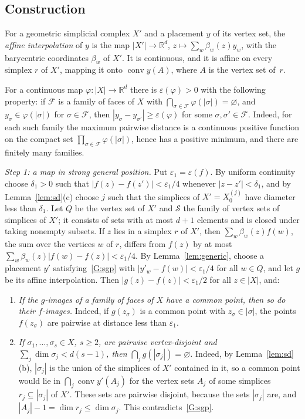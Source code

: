 \documentclass[11pt]{article}
\theoremstyle{definition}
\numberwithin{equation}{section}
\newcommand{\R}{\mathbb R}
\DeclareMathOperator{\conv}{conv}
\begin{document}
\subsection{Construction}

For a geometric simplicial complex $X'$ and a placement $y$ of its vertex set, the \emph{affine interpolation} of $y$ is the map $|X'|\to\R^d$, $z\mapsto\sum_w\beta_w(z)y_w$, with the barycentric coordinates $\beta_w$ of $X'$. It is continuous, and it is affine on every simplex $r$ of $X'$, mapping it onto $\conv y(A)$, where $A$ is the vertex set of~$r$.

For a continuous map $\varphi:|X|\to\R^d$ there is $\varepsilon(\varphi)>0$ with the following property: if $\mathcal F$ is a family of faces of $X$ with $\bigcap_{\sigma\in\mathcal F}\varphi(|\sigma|)=\varnothing$, and $y_\sigma\in\varphi(|\sigma|)$ for $\sigma\in\mathcal F$, then $|y_\sigma-y_{\sigma'}|\ge\varepsilon(\varphi)$ for some $\sigma,\sigma'\in\mathcal F$. Indeed, for each such family the maximum pairwise distance is a continuous positive function on the compact set $\prod_{\sigma\in\mathcal F}\varphi(|\sigma|)$, hence has a positive minimum, and there are finitely many families.

\emph{Step 1: a map in strong general position.} Put $\varepsilon_1=\varepsilon(f)$. By uniform continuity choose $\delta_1>0$ such that $|f(z)-f(z')|<\varepsilon_1/4$ whenever $|z-z'|<\delta_1$, and by Lemma~\ref{lem:sd}(c) choose $j$ such that the simplices of $X'=X_0^{(j)}$ have diameter less than $\delta_1$. Let $Q$ be the vertex set of $X'$ and $\mathcal S$ the family of vertex sets of simplices of $X'$; it consists of sets with at most $d+1$ elements and is closed under taking nonempty subsets. If $z$ lies in a simplex $r$ of $X'$, then $\sum_w\beta_w(z)f(w)$, the sum over the vertices $w$ of $r$, differs from $f(z)$ by at most $\sum_w\beta_w(z)|f(w)-f(z)|<\varepsilon_1/4$. By Lemma~\ref{lem:generic}, choose a placement $y'$ satisfying~\ref{G:sgp} with $|y'_w-f(w)|<\varepsilon_1/4$ for all $w\in Q$, and let $g$ be its affine interpolation. Then $|g(z)-f(z)|<\varepsilon_1/2$ for all $z\in|X|$, and:
\begin{enumerate}[label=\textup{(A\arabic*)}]
\item\label{A:gf} \emph{If the $g$-images of a family of faces of $X$ have a common point, then so do their $f$-images.} Indeed, if $g(z_\sigma)$ is a common point with $z_\sigma\in|\sigma|$, the points $f(z_\sigma)$ are pairwise at distance less than $\varepsilon_1$.
\item\label{A:sgp} \emph{If $\sigma_1,\ldots,\sigma_s\in X$, $s\ge2$, are pairwise vertex-disjoint and $\sum_j\dim\sigma_j<d(s-1)$, then $\bigcap_jg(|\sigma_j|)=\varnothing$.} Indeed, by Lemma~\ref{lem:sd}(b), $|\sigma_j|$ is the union of the simplices of $X'$ contained in it, so a common point would lie in $\bigcap_j\conv y'(A_j)$ for the vertex sets $A_j$ of some simplices $r_j\subseteq|\sigma_j|$ of $X'$. These sets are pairwise disjoint, because the sets $|\sigma_j|$ are, and $|A_j|-1=\dim r_j\le\dim\sigma_j$. This contradicts~\ref{G:sgp}.
\end{enumerate}
\end{document}

